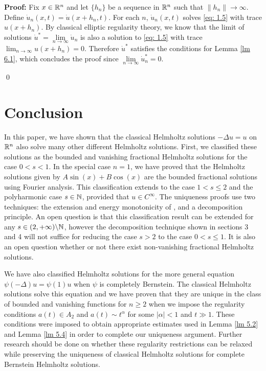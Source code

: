 \documentclass{article}
\begin{document}
\noindent
\textbf{Proof:} Fix $x \in \mathbb{R}^n$ and let $\{h_n\}$ be a sequence in $\mathbb{R}^n$ such that $\|h_n\| \to \infty$. Define $\dot{u}_n(x,t) = \dot{u}(x+h_n,t)$. For each $n$, $\dot{u}_n(x,t)$ solves \eqref{eq: 1.5} with trace $u(x+h_n)$. By classical elliptic regularity theory, we know that the limit of solutions $\dot{u}^* = \lim\limits_{n \to \infty} \dot{u}_n $ is also a solution to \eqref{eq: 1.5} with trace $\lim_{n \to \infty} u(x+h_n)=0$. Therefore $\dot{u}^*$ satisfies the conditions for Lemma \ref{lm 6.1}, which concludes the proof since $ \lim\limits_{n \to \infty} \dot{u}^*_n = 0$.

\qed


\section{Conclusion}

\indent
 
In this paper, we have shown that the classical Helmholtz solutions $-\Delta u = u$ on $\mathbb{R}^n$ also solve many other different Helmholtz solutions. First, we classified these solutions as the bounded and vanishing fractional Helmholtz solutions for the case $0<s<1$. In the special case $n=1$, we have proved that the Helmholtz solutions given by $A\sin(x)+B\cos(x)$ are the  bounded fractional solutions using Fourier analysis. This classification extends to the case $1<s\le2$ and the polyharmonic case $s \in \mathbb{N}$, provided that $u \in C^\infty$. The uniqueness proofs use two techniques: the extension and energy monotonicity of \cite{Frank}, and a decomposition principle.  An open question is that this classification result can be extended for any $s \in (2,+\infty) \backslash \mathbb{N}$, however the decomposition technique shown in sections 3 and 4 will not suffice for reducing the case $s>2$ to the case $0<s \le 1$. It is also an open question whether or not there exist non-vanishing fractional Helmholtz solutions. 

We have also classified Helmholtz solutions for the more general equation $\psi(-\Delta)u = \psi(1)u$ when $\psi$ is completely Bernstein. The classical Helmholtz solutions solve this equation and we have proven that they are unique in the class of bounded and vanishing functions for $n \ge 2$ when we impose the regularity conditions $a(t) \in A_2$ and $a(t) \sim t^\alpha$ for some $|\alpha|<1$ and $t\gg 1$. These conditions were imposed to obtain appropriate estimates used in Lemma \ref{lm 5.2} and Lemma \ref{lm 5.4} in order to complete our uniqueness argument. Further research should be done on whether these regularity restrictions can be relaxed while preserving the uniqueness of classical Helmholtz solutions for complete Bernstein Helmholtz solutions.
\end{document}
